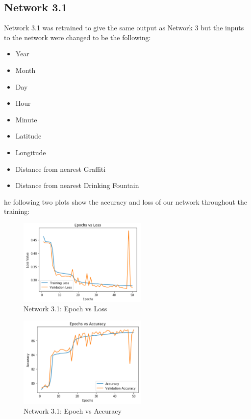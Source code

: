 \documentclass[conference]{IEEEtran}
\begin{document}
\subsection{Network 3.1 \cite{Network_3.1}}

Network 3.1 was retrained to give the same output as Network 3 but the inputs to the network were changed to be the following:

\begin{itemize}
  \item Year
  \item Month
  \item Day
  \item Hour
  \item Minute
  \item Latitude
  \item Longitude
  \item Distance from nearest Graffiti
  \item Distance from nearest Drinking Fountain
\end{itemize}

he following two plots show the accuracy and loss of our network throughout the training:

\begin{figure}[H]
  \centering
  \captionsetup{justification=centering}
  \centering
  \includegraphics[width=2.5in]{19.png}
  \caption{Network 3.1: Epoch vs Loss}  
  \label{1}
\end{figure}

\begin{figure}[H]
  \centering
  \captionsetup{justification=centering}
  \centering
  \includegraphics[width=2.5in]{20.png}
  \caption{Network 3.1: Epoch vs Accuracy}  
  \label{1}
\end{figure}
\end{document}
